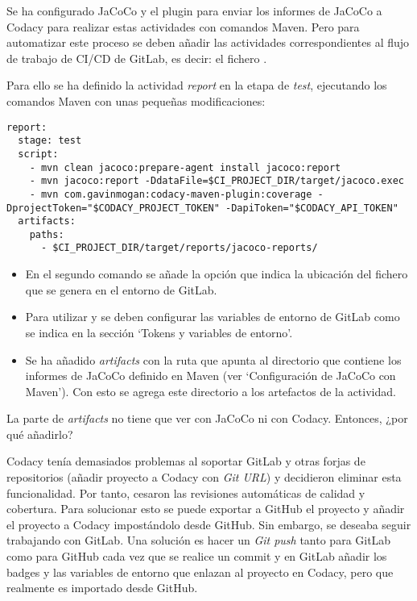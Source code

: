 Se ha configurado JaCoCo y el plugin para enviar los informes de JaCoCo a Codacy para realizar estas actividades con comandos Maven. Pero para automatizar este proceso se deben añadir las actividades correspondientes al flujo de trabajo de CI/CD de GitLab, es decir: el fichero .

Para ello se ha definido la actividad \textit{report} en la etapa de \textit{test}, ejecutando los comandos Maven  con unas pequeñas modificaciones:\\
\begin{minipage}{\linewidth}
{\tiny
\begin{lstlisting}[breaklines]
report:
  stage: test
  script:
	- mvn clean jacoco:prepare-agent install jacoco:report
	- mvn jacoco:report -DdataFile=$CI_PROJECT_DIR/target/jacoco.exec
	- mvn com.gavinmogan:codacy-maven-plugin:coverage -DprojectToken="$CODACY_PROJECT_TOKEN" -DapiToken="$CODACY_API_TOKEN"
  artifacts:
	paths:
	  - $CI_PROJECT_DIR/target/reports/jacoco-reports/
\end{lstlisting}
}
\end{minipage}
\begin{itemize}
	\item En el segundo comando se añade la opción  que indica la ubicación del fichero  que se genera en el entorno de GitLab.
	\item Para utilizar  y  se deben configurar las variables de entorno de GitLab como se indica en la sección `Tokens y variables de entorno'.
	\item Se ha añadido \textit{artifacts} con la ruta que apunta al directorio que contiene los informes de JaCoCo definido en Maven (ver `Configuración de JaCoCo con Maven'). Con esto se agrega este directorio a los artefactos de la actividad.
\end{itemize}

La parte de \textit{artifacts} no tiene que ver con JaCoCo ni con Codacy. Entonces, ¿por qué añadirlo? 

Codacy tenía demasiados problemas al soportar GitLab y otras forjas de repositorios (añadir proyecto a Codacy con \textit{Git URL}) y decidieron eliminar esta funcionalidad. Por tanto, cesaron las revisiones automáticas de calidad y cobertura. Para solucionar esto se puede exportar a GitHub el proyecto y añadir el proyecto a Codacy impostándolo desde GitHub. Sin embargo, se deseaba seguir trabajando con GitLab. Una solución es hacer un \textit{Git push} tanto para GitLab como para GitHub cada vez que se realice un commit y en GitLab añadir los badges y las variables de entorno que enlazan al proyecto en Codacy, pero que realmente es importado desde GitHub.

